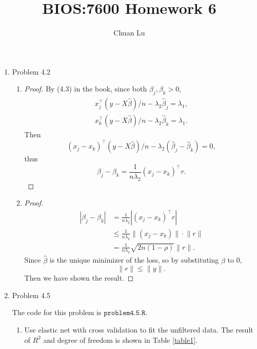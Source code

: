 \documentclass{article}
\begin{document}
\author{Chuan Lu}
\title{BIOS:7600 Homework 6}
\maketitle

\medskip

\begin{enumerate}

\item Problem 4.2

\begin{enumerate}

\item 

\begin{proof}
By (4.3) in the book, since both $\beta_j, \beta_k > 0$,
$$
\begin{aligned}
x_j^\top (y-X\hat\beta)/n - \lambda_2\hat\beta_j = \lambda_1, \\
x_k^\top (y-X\hat\beta)/n - \lambda_2\hat\beta_k = \lambda_1.
\end{aligned}
$$
Then
$$
(x_j - x_k)^\top (y-X\hat\beta)/n - \lambda_2(\hat\beta_j - \hat\beta_k) = 0,
$$
thus
$$
\beta_j - \beta_k = \frac{1}{n\lambda_2}(x_j - x_k)^\top r.
$$

\end{proof}

\item
\begin{proof}
$$
\begin{aligned}
|\beta_j -\beta_k| &= \frac{1}{n\lambda_2} | (x_j -x_k)^\top r| \\
&\le \frac{1}{n\lambda_2} \lVert (x_j-x_k)\rVert\cdot \lVert r\rVert \\
&=\frac{1}{n\lambda_2}\sqrt{2n(1-\rho)}\lVert r\rVert.
\end{aligned}
$$
Since $\hat\beta$ is the unique minimizer of the loss, so by substituting $\beta$ to 0,
$$
\lVert r\rVert \le \lVert y\rVert.
$$
Then we have shown the result.
\end{proof}

\end{enumerate}

\item Problem 4.5

The code for this problem is $\texttt{problem4.5.R}$.

\begin{enumerate}

\item Use elastic net with cross validation to fit the unfiltered data. The result of $R^2 $ and degree of freedom is shown in Table \ref{table1}.


\end{enumerate}
\end{enumerate}
\end{document}
